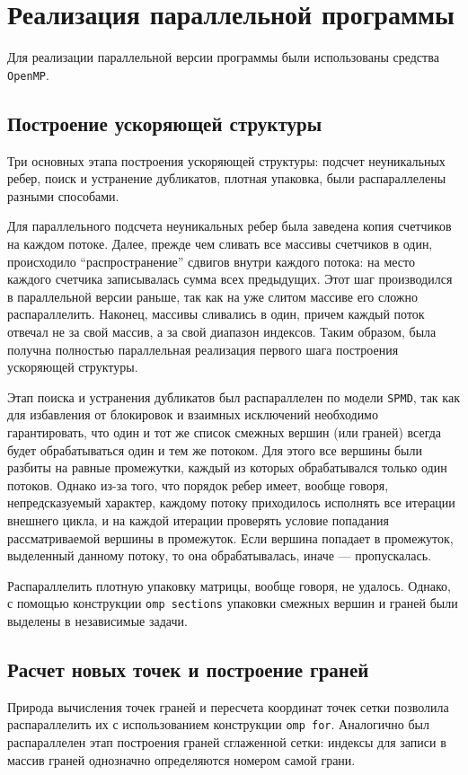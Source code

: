 \documentclass[14pt]{extarticle}
\begin{document}
\newpage
\section{Реализация параллельной программы}
Для реализации параллельной версии программы были использованы средства \texttt{OpenMP}.

\subsection{Построение ускоряющей структуры}
Три основных этапа построения ускоряющей структуры: подсчет неуникальных ребер, поиск и устранение дубликатов, плотная упаковка, были распараллелены разными способами.

Для параллельного подсчета неуникальных ребер была заведена копия счетчиков на каждом потоке. Далее, прежде чем сливать все массивы счетчиков в один, происходило ``распространение'' сдвигов внутри каждого потока: на место каждого счетчика записывалась сумма всех предыдущих. Этот шаг производился в параллельной версии раньше, так как на уже слитом массиве его сложно распараллелить. Наконец, массивы сливались в один, причем каждый поток отвечал не за свой массив, а за свой диапазон индексов. Таким образом, была получна полностью параллельная реализация первого шага построения ускоряющей структуры.

Этап поиска и устранения дубликатов был распараллелен по модели \texttt{SPMD}, так как для избавления от блокировок и взаимных исключений необходимо гарантировать, что один и тот же список смежных вершин (или граней) всегда будет обрабатываться один и тем же потоком. Для этого все вершины были разбиты на равные промежутки, каждый из которых обрабатывался только один потоков. Однако из-за того, что порядок ребер имеет, вообще говоря, непредсказуемый характер, каждому потоку приходилось исполнять все итерации внешнего цикла, и на каждой итерации проверять условие попадания рассматриваемой вершины в промежуток. Если вершина попадает в промежуток, выделенный данному потоку, то она обрабатывалась, иначе --- пропускалась.

Распараллелить плотную упаковку матрицы, вообще говоря, не удалось. Однако, с помощью конструкции \texttt{omp sections} упаковки смежных вершин и граней были выделены в независимые задачи.

\subsection{Расчет новых точек и построение граней}
Природа вычисления точек граней и пересчета координат точек сетки позволила распараллелить их с использованием конструкции \texttt{omp for}. Аналогично был распараллелен этап построения граней сглаженной сетки: индексы для записи в массив граней однозначно определяются номером самой грани.
\end{document}
